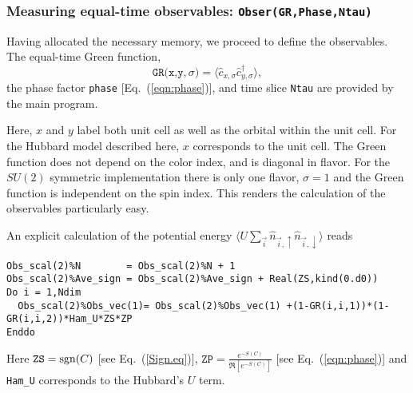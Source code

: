 \subsubsection{Measuring equal-time observables: \texttt{Obser(GR,Phase,Ntau)}} \label{sec:EqualTimeobs}

Having allocated the necessary memory, we proceed to define the observables. The equal-time  Green function,
\begin{equation}
	 \texttt{GR(x,y},\sigma{\texttt)}  = \langle \hat{c}^{\phantom{\dagger}}_{x,\sigma} \hat{c}^{\dagger}_{y,\sigma}  \rangle,
\end{equation}
the  phase factor \texttt{phase} [Eq.~(\ref{eqn:phase})], and time slice \texttt{Ntau}   are provided by the main program.  

Here,   $x$ and $y$ label  both unit cell as well as the orbital within the unit cell. For the Hubbard model described here, $x$ corresponds to the unit cell.  The Green function  does not depend on the color index, and is diagonal in flavor.  For the $SU(2)$ symmetric implementation  there is only one flavor, $\sigma = 1$ and the Green function is  independent on the spin index.  This renders the calculation of the observables particularly easy.   

An explicit calculation of the   potential energy  $ \langle U \sum_{\vec{i}}  \hat{n}_{\vec{i},\uparrow}   \hat{n}_{\vec{i},\downarrow}  \rangle $ reads 
\begin{lstlisting}[style=fortran]
Obs_scal(2)%N        = Obs_scal(2)%N + 1
Obs_scal(2)%Ave_sign = Obs_scal(2)%Ave_sign + Real(ZS,kind(0.d0))
Do i = 1,Ndim
  Obs_scal(2)%Obs_vec(1)= Obs_scal(2)%Obs_vec(1) +(1-GR(i,i,1))*(1-GR(i,i,2))*Ham_U*ZS*ZP
Enddo
\end{lstlisting} 
Here  $ \texttt{ZS} = \operatorname{sgn}(C) $  [see Eq.~(\ref{Sign.eq})],  $ \texttt{ZP} =   \frac{e^{-S(C)}} {\Re \left[e^{-S(C)} \right]}   $ [see Eq.~(\ref{eqn:phase})] and  \texttt{Ham\_U}  corresponds to the Hubbard's $U$ term.

